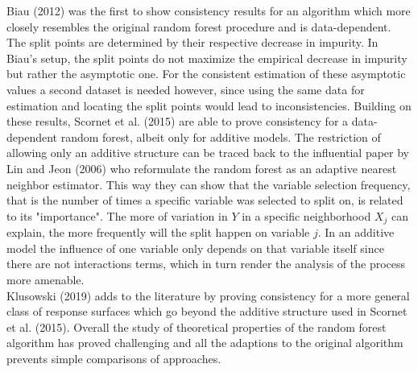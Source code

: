 {Biau (2012) was the first to show consistency results for an algorithm which more closely resembles the original random forest procedure and is data-dependent. The split points are determined by their respective decrease in impurity. In Biau's setup, the split points do not maximize the empirical decrease in impurity but rather the asymptotic one. For the consistent estimation of these asymptotic values a second dataset is needed however, since using the same data for estimation and locating the split points would lead to inconsistencies. Building on these results, Scornet et al. (2015) are able to prove consistency for a data-dependent random forest, albeit only for additive models. The restriction of allowing only an additive structure can be traced back to the influential paper by Lin and Jeon (2006) who reformulate the random forest as an adaptive nearest neighbor estimator. This way they can show that the variable selection frequency, that is the number of times a specific variable was selected to split on, is related to its "importance". The more of variation in $Y$ in a specific neighborhood $X_j$ can explain, the more frequently will the split happen on variable $j$. In an additive model the influence of one variable only depends on that variable itself since there are not interactions terms, which in turn render the analysis of the process more amenable. \\
Klusowski (2019) adds to the literature by proving consistency for a more general class of response surfaces which go beyond the additive structure used in Scornet et al. (2015). Overall the study of theoretical properties of the random forest algorithm has proved challenging and all the adaptions to the original algorithm prevents simple comparisons of approaches.
}